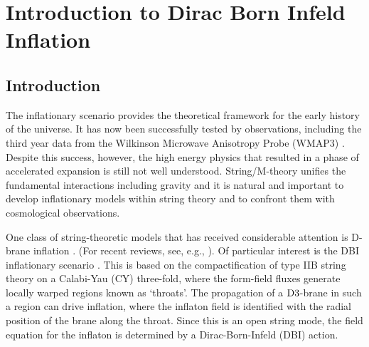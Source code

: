 \renewcommand{\CVSrevision}{\version$Id: dbi-intro.tex,v 1.12 2009/07/28 17:09:30 ith Exp $}
\chapter{Introduction to Dirac Born Infeld Inflation}
\label{ch:dbi-intro}

\section{Introduction}
% 
\label{sec:dbi-intro}


The inflationary scenario provides the 
theoretical framework for the early history 
of the universe. It has now been successfully tested by observations, 
including the third year data from the Wilkinson Microwave Anisotropy 
Probe (WMAP3) \cite{spergel}. Despite this success, however, the high energy 
physics that resulted in a phase of accelerated expansion is still 
not well understood. String/M-theory unifies the fundamental interactions 
including gravity and it is natural and important to 
develop inflationary models within string theory and to confront them with 
cosmological observations. 
 

One class of string-theoretic models that has received 
considerable attention is D-brane inflation
\cite{brane1,brane2,brane3,brane4,brane5,
brane6,brane7,brane8,brane9,brane10,brane11,brane12,brane13,
brane14,brane15,brane16,brane17,Brodie:2003qv,Vikman:2006hk, 
Mukhanov:2005bu,Kallosh:2007wm,brane18,
brane19,brane20,brane21}. 
(For recent reviews, see, e.g., \cite{tyereview,cline}). 
Of particular interest 
is the DBI inflationary scenario \cite{brane6,brane11}. 
This is based on the compactification of type IIB string theory on a 
Calabi-Yau (CY) three-fold, where the form-field fluxes generate locally
warped regions known as `throats'.  The propagation of a 
${\rm D3}$-brane in such a region can drive inflation, where the inflaton 
field is identified with the radial position of the brane 
along the throat. Since this is an open string mode, the field 
equation for the inflaton is determined by a Dirac-Born-Infeld (DBI) action. 


